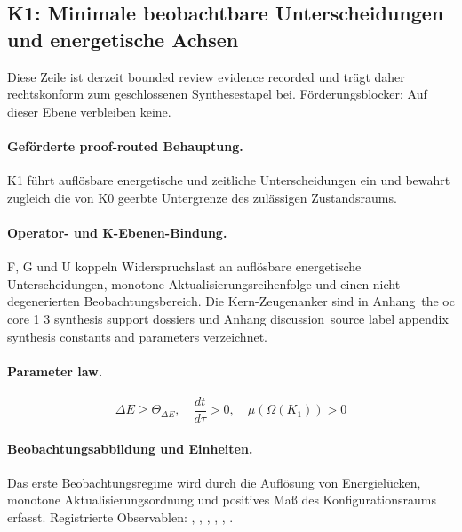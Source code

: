 \subsection{K1: Minimale beobachtbare Unterscheidungen und energetische Achsen}
\label{sec:oc-core-1-3-synthesis-k1}
Diese Zeile ist derzeit bounded review evidence recorded und trägt daher rechtskonform zum geschlossenen Synthesestapel bei.
Förderungsblocker: Auf dieser Ebene verbleiben keine.

\paragraph{Geförderte proof-routed Behauptung.}
K1 führt auflösbare energetische und zeitliche Unterscheidungen ein und bewahrt zugleich die von K0 geerbte Untergrenze des zulässigen Zustandsraums.

\paragraph{Operator- und K-Ebenen-Bindung.}
F, G und U koppeln Widerspruchslast an auflösbare energetische Unterscheidungen, monotone Aktualisierungsreihenfolge und einen nicht-degenerierten Beobachtungsbereich.
Die Kern-Zeugenanker sind in Anhang~the oc core 1 3 synthesis support dossiers und Anhang discussion~source label appendix synthesis constants and parameters verzeichnet.

\paragraph{Parameter law.}
\[
\Delta E \geq \Theta_{\Delta E},\quad \frac{dt}{d\tau} > 0,\quad \mu(\Omega(K_1)) > 0
\]

\paragraph{Beobachtungsabbildung und Einheiten.}
Das erste Beobachtungsregime wird durch die Auflösung von Energielücken, monotone Aktualisierungsordnung und positives Maß des Konfigurationsraums erfasst.
Registrierte Observablen: , \allowbreak {}, \allowbreak {}, \allowbreak {}, \allowbreak {}, \allowbreak {}.

